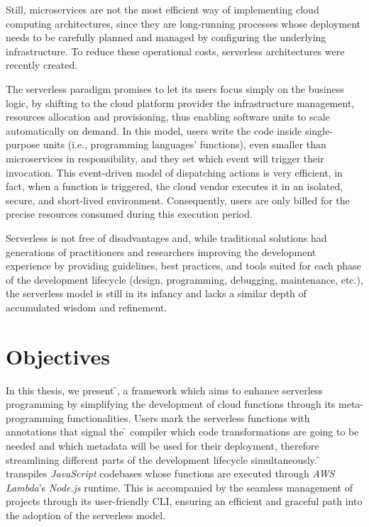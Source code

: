 Still, microservices are not the most efficient way of implementing cloud computing architectures,
since they are long-running processes whose deployment needs to be carefully planned and managed
by configuring the underlying infrastructure. To reduce these operational costs,
serverless architectures were recently created.

The serverless paradigm promises to let its users focus simply on the business logic,
by shifting to the cloud platform provider the infrastructure management,
resources allocation and provisioning, thus enabling software units to scale automatically on demand.
In this model, users write the code inside single-purpose units (i.e., programming languages' functions),
even smaller than microservices in responsibility,
and they set which event will trigger their invocation.
This event-driven model of dispatching actions is very efficient, in fact,
when a function is triggered, the cloud vendor executes it in an isolated, secure, and short-lived environment.
Consequently, users are only billed for the precise resources consumed during this execution period.

Serverless is not free of disadvantages and, while traditional solutions
had generations of practitioners and researchers improving the development experience
by providing guidelines, best practices, and tools suited for each phase
of the development lifecycle (design, programming, debugging, maintenance, etc.),
the serverless model is still in its infancy and lacks a similar depth of accumulated wisdom and refinement.

\section{Objectives}

In this thesis, we present \f{}, a framework which aims to enhance serverless programming
by simplifying the development of cloud functions through its meta-programming functionalities.
Users mark the serverless functions with annotations that signal the \f{} compiler
which code transformations are going to be needed and which metadata will be used
for their deployment, therefore streamlining different parts of the development lifecycle simultaneously.
\f{} transpiles \textit{JavaScript} codebases whose functions are executed
through \textit{AWS Lambda}'s \textit{Node.js} runtime.
This is accompanied by the seamless management of projects
through its user-friendly CLI, ensuring an efficient and graceful path
into the adoption of the serverless model.
